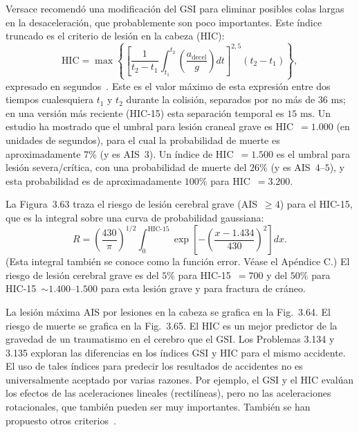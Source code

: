 \documentclass[12pt]{book}
\begin{document}
Versace recomendó una modificación del GSI para eliminar posibles colas largas en la desaceleración, que probablemente son poco importantes. Este índice truncado es el criterio de lesión en la cabeza (HIC):
\begin{equation}
\text{HIC} = \max \left\{ \left[ \frac{1}{t_2 - t_1} \int_{t_1}^{t_2} \left(\frac{a_{\text{decel}}}{g}\right) dt \right]^{2{,}5} (t_2 - t_1) \right\},
\label{eq:3.117}
\end{equation}
expresado en segundos~\cite{ref136}. Este es el valor máximo de esta expresión entre dos tiempos cualesquiera $t_1$ y $t_2$ durante la colisión, separados por no más de $36\text{ ms}$; en una versión más reciente (HIC-15) esta separación temporal es $15\text{ ms}$. Un estudio ha mostrado que el umbral para lesión craneal grave es HIC~$= 1.000$ (en unidades de segundos), para el cual la probabilidad de muerte es aproximadamente $7\%$ (y es AIS~$3$). Un índice de HIC~$= 1.500$ es el umbral para lesión severa/crítica, con una probabilidad de muerte del $26\%$ (y es AIS~$4$--$5$), y esta probabilidad es de aproximadamente $100\%$ para HIC~$= 3.200$.

La Figura~3.63 traza el riesgo de lesión cerebral grave (AIS~$\geq 4$) para el HIC-15, que es la integral sobre una curva de probabilidad gaussiana:
\begin{equation}
R = \left(\frac{430}{\pi}\right)^{1/2} \int_0^{\text{HIC-15}} \exp\!\left[-\left(\frac{x - 1.434}{430}\right)^2\right] dx.
\label{eq:3.118}
\end{equation}
(Esta integral también se conoce como la función error. Véase el Apéndice C.) El riesgo de lesión cerebral grave es del $5\%$ para HIC-15~$= 700$ y del $50\%$ para HIC-15~$\sim 1.400$--$1.500$ para esta lesión grave y para fractura de cráneo.

La lesión máxima AIS por lesiones en la cabeza se grafica en la Fig.~3.64. El riesgo de muerte se grafica en la Fig.~3.65. El HIC es un mejor predictor de la gravedad de un traumatismo en el cerebro que el GSI. Los Problemas 3.134 y 3.135 exploran las diferencias en los índices GSI y HIC para el mismo accidente. El uso de tales índices para predecir los resultados de accidentes no es universalmente aceptado por varias razones. Por ejemplo, el GSI y el HIC evalúan los efectos de las aceleraciones lineales (rectilíneas), pero no las aceleraciones rotacionales, que también pueden ser muy importantes. También se han propuesto otros criterios~\cite{ref79}.
\end{document}

